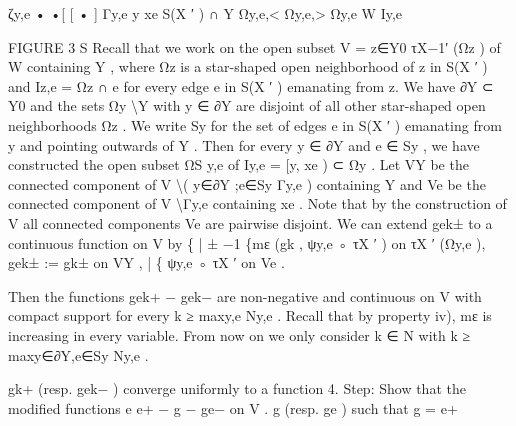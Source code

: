 \documentclass[
  10pt,
]{article}
\newenvironment{Shaded}{}{}
\newcommand{\NormalTok}[1]{#1}
\begin{document}
\begin{Shaded}
\begin{Highlighting}[]
\NormalTok{                                                     ζy,e}
\NormalTok{          •                       •[            [     •      ]}
\NormalTok{                                                      Γy,e}
\NormalTok{                                  y                                          xe}
\NormalTok{              S(X ′ ) ∩ Y              Ωy,e,\textless{}                    Ωy,e,\textgreater{}}
\NormalTok{                                                     Ωy,e}
\NormalTok{      W                                               Iy,e}

\NormalTok{                                             FIGURE 3}
\NormalTok{                                                   S}
\NormalTok{   Recall that we work on the open subset V = z∈Y0 τX−1′ (Ωz ) of W containing Y , where}
\NormalTok{Ωz is a star{-}shaped open neighborhood of z in S(X ′ ) and Iz,e = Ωz ∩ e for every edge}
\NormalTok{e in S(X ′ ) emanating from z. We have ∂Y ⊂ Y0 and the sets Ωy \textbackslash{}Y with y ∈ ∂Y are}
\NormalTok{disjoint of all other star{-}shaped open neighborhoods Ωz . We write Sy for the set of edges}
\NormalTok{e in S(X ′ ) emanating from y and pointing outwards of Y . Then for every y ∈ ∂Y and}
\NormalTok{e ∈ Sy , we have constructed the open subset ΩS     y,e of Iy,e = [y, xe ) ⊂ Ωy .}
\NormalTok{   Let VY be the connected component of V \textbackslash{}( y∈∂Y ;e∈Sy Γy,e ) containing Y and Ve be}
\NormalTok{the connected component of V \textbackslash{}Γy,e containing xe . Note that by the construction of V}
\NormalTok{all connected components Ve are pairwise disjoint. We can extend gek± to a continuous}
\NormalTok{function on V by}
\NormalTok{                                \{}
\NormalTok{                                |      ±                       −1}
\NormalTok{                                \{mε (gk , ψy,e ◦ τX ′ ) on τX ′ (Ωy,e ),}
\NormalTok{                         gek± := gk±                      on VY ,}
\NormalTok{                                |}
\NormalTok{                                \{}
\NormalTok{                                 ψy,e ◦ τX ′              on Ve .}

\NormalTok{  Then the functions gek+ − gek− are non{-}negative and continuous on V with compact}
\NormalTok{support for every k ≥ maxy,e Ny,e . Recall that by property iv), mε is increasing in every}
\NormalTok{variable. From now on we only consider k ∈ N with k ≥ maxy∈∂Y,e∈Sy Ny,e .}

\NormalTok{                                                gk+ (resp. gek− ) converge uniformly to a function}
\NormalTok{      4. Step: Show that the modified functions e}
\NormalTok{               e+         −                g − ge− on V .}
\NormalTok{               g (resp. ge ) such that g = e+}



\end{Highlighting}
\end{Shaded}
\end{document}
